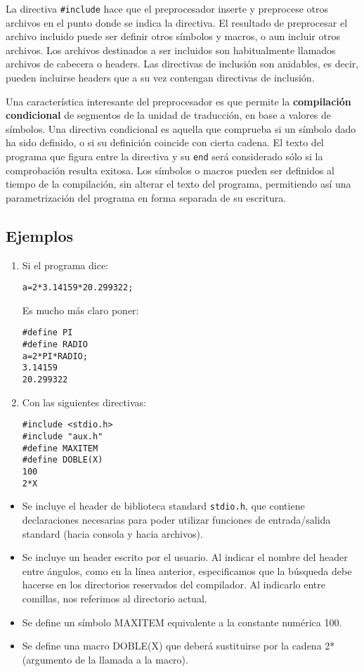 La directiva \texttt{\#include} hace que el preprocesador inserte y
preprocese otros archivos en el punto donde se indica la
directiva. El resultado de preprocesar el archivo incluido
puede ser definir otros símbolos y macros, o aun incluir
otros archivos.
Los archivos destinados a ser incluidos son habitualmente
llamados archivos de cabecera o headers.
Las directivas de inclusión son anidables, es decir, pueden incluirse headers que a su vez contengan
directivas de inclusión.

Una característica interesante del preprocesador es que permite la \textbf{compilación condicional} de
segmentos de la unidad de traducción, en base a valores de símbolos. Una directiva condicional es
aquella que comprueba si un símbolo dado ha sido definido, o si su definición coincide con cierta
cadena. El texto del programa que figura entre la directiva y su \texttt{end} será considerado sólo si la
comprobación resulta exitosa. Los símbolos o macros pueden ser definidos al tiempo de la
compilación, sin alterar el texto del programa, permitiendo así una parametrización del programa en
forma separada de su escritura.

\subsection{Ejemplos}
\begin{enumerate}
	\item Si el programa dice:
\begin{lstlisting}
a=2*3.14159*20.299322;
\end{lstlisting}
Es mucho más claro poner:
\begin{lstlisting}
#define PI
#define RADIO
a=2*PI*RADIO;
3.14159
20.299322
\end{lstlisting}
\item Con las siguientes directivas:
\begin{lstlisting}
#include <stdio.h>
#include "aux.h"
#define MAXITEM
#define DOBLE(X)
100
2*X
\end{lstlisting}
\end{enumerate}
\begin{itemize}
	\item Se incluye el header de biblioteca standard \texttt{stdio.h}, que contiene declaraciones necesarias para
poder utilizar funciones de entrada/salida standard (hacia consola y hacia archivos).
\item Se incluye un header escrito por el usuario. Al indicar el nombre del header entre ángulos, como
en la línea anterior, especificamos que la búsqueda debe hacerse en los directorios reservados del
compilador. Al indicarlo entre comillas, nos referimos al directorio actual.
\item Se define un símbolo MAXITEM equivalente a la constante numérica 100.
\item Se define una macro DOBLE(X) que deberá sustituirse por la cadena 2*(argumento de la llamada
a la macro).
\end{itemize}


